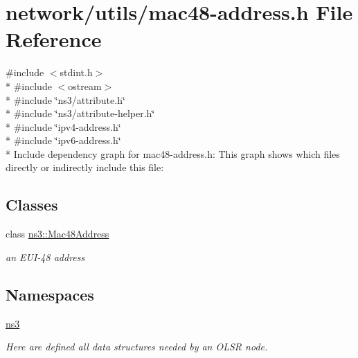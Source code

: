 \hypertarget{mac48-address_8h}{}\section{network/utils/mac48-\/address.h File Reference}
\label{mac48-address_8h}
{\ttfamily \#include $<$stdint.\+h$>$}\\*
{\ttfamily \#include $<$ostream$>$}\\*
{\ttfamily \#include \char`\"{}ns3/attribute.\+h\char`\"{}}\\*
{\ttfamily \#include \char`\"{}ns3/attribute-\/helper.\+h\char`\"{}}\\*
{\ttfamily \#include \char`\"{}ipv4-\/address.\+h\char`\"{}}\\*
{\ttfamily \#include \char`\"{}ipv6-\/address.\+h\char`\"{}}\\*
Include dependency graph for mac48-\/address.h\+:
This graph shows which files directly or indirectly include this file\+:
\subsection*{Classes}
\begin{DoxyCompactItemize}
\item 
class \hyperlink{classns3_1_1Mac48Address}{ns3\+::\+Mac48\+Address}
\begin{DoxyCompactList}\small\item\em an E\+U\+I-\/48 address \end{DoxyCompactList}\end{DoxyCompactItemize}
\subsection*{Namespaces}
\begin{DoxyCompactItemize}
\item 
 \hyperlink{namespacens3}{ns3}
\begin{DoxyCompactList}\small\item\em Here are defined all data structures needed by an O\+L\+SR node. \end{DoxyCompactList}\end{DoxyCompactItemize}
